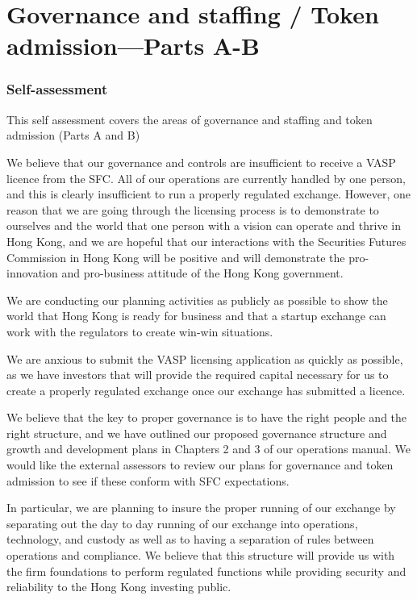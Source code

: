 \documentclass[]{report}
\begin{document}
\chapter{Governance and staffing / Token admission—Parts A-B}
\subsection{Self-assessment}
This self assessment covers the areas of governance and staffing and
token admission (Parts A and B)

We believe that our governance and controls are insufficient
to receive a VASP licence from the SFC.  All of our operations are
currently handled by one person, and this is clearly insufficient to
run a properly regulated exchange.  However, one reason that we are
going through the licensing process is to demonstrate to ourselves and
the world that one person with a vision can operate and thrive in Hong
Kong, and we are hopeful that our interactions with the Securities
Futures Commission in Hong Kong will be positive and will demonstrate
the pro-innovation and pro-business attitude of the Hong Kong
government.

We are conducting our planning activities as publicly as possible to
show the world that Hong Kong is ready for business and that a startup
exchange can work with the regulators to create win-win situations.

We are anxious to submit the VASP licensing application as quickly as
possible, as we have investors that will provide the required capital
necessary for us to create a properly regulated exchange once our
exchange has submitted a licence.

We believe that the key to proper governance is to have the right
people and the right structure, and we have outlined our proposed
governance structure and growth and development plans in Chapters 2
and 3 of our operations manual.  We would like the external assessors
to review our plans for governance and token admission to see if these
conform with SFC expectations.

In particular, we are planning to insure the proper running of our
exchange by separating out the day to day running of our exchange into
operations, technology, and custody as well as to having a separation
of rules between operations and compliance.  We believe that this
structure will provide us with the firm foundations to perform
regulated functions while providing security and reliability to the
Hong Kong investing public.
\end{document}
